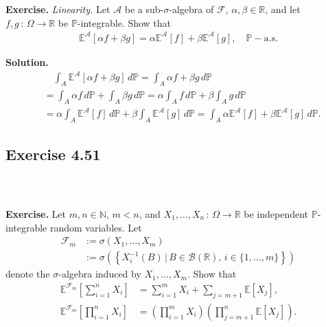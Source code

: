 \documentclass{beamer}
\numberwithin{equation}{section}
\newenvironment{frame2}{\begin{frame}\frametitle{{\normalsize \secname} \\ {\large \subsecname}}}{\end{frame}}
\begin{document}
\begin{frame2}
    \textbf{Exercise.}
    \textit{Linearity.}
    Let $\mathcal{A}$ be a sub-$\sigma$-algebra of $\mathcal{F}$, $\alpha,\beta \in \mathbb{R}$, and let $f,g \, : \, \Omega \rightarrow \mathbb{R}$ be $\mathbb{P}$-integrable.
    Show that
    \begin{align}
        \mathbb{E}^\mathcal{A}[\alpha f + \beta g] = \alpha \mathbb{E}^\mathcal{A}[ f] + \beta\mathbb{E}^\mathcal{A}[g], \quad \mathbb{P}-\text{a.s.} 
    \end{align}

    \vspace{10pt}
    \textbf{Solution.}
    \begin{align*}
        &\quad\int_A \mathbb{E}^{\mathcal{A}}\left[\alpha f + \beta g\right] \, d\mathbb{P} = \int_A \alpha f + \beta g \, d\mathbb{P}\\
        &= \int_A \alpha f \, d\mathbb{P} + \int_A \beta g \, d\mathbb{P} =  \alpha \int_A f \, d\mathbb{P} +  \beta \int_A g \, d\mathbb{P} \\
        &= \alpha \int_A \mathbb{E}^{\mathcal{A}}\left[f\right] \, d\mathbb{P} +  \beta \int_A \mathbb{E}^{\mathcal{A}}\left[g\right] \, d\mathbb{P} =  \int_A \alpha \mathbb{E}^{\mathcal{A}}\left[f\right] +  \beta \mathbb{E}^{\mathcal{A}}\left[g\right] \, d\mathbb{P}.
    \end{align*}
\end{frame2}

\subsection{Exercise 4.51}

\begin{frame2}
    \textbf{Exercise.}
    Let $m,n \in \mathbb{N}$, $m < n$, and $X_1, \ldots, X_n \, : \, \Omega \rightarrow \mathbb{R}$ be independent $\mathbb{P}$-integrable random variables.
    Let
    \begin{align}
        \mathcal{F}_m&:=\sigma(X_1,\ldots,X_m)\\
        &:=\sigma\left(\left\{X_i^{-1}(B)\,|\,B\in\mathcal{B}(\mathbb{R}),\, i \in \{1,\ldots,m\} \right\}\right)
    \end{align}
    denote the $\sigma$-algebra induced by $X_1,\ldots,X_m$.
    Show that
    \begin{align}
        \mathbb{E}^{\mathcal{F}_m}\left[ \sum_{i = 1}^n X_i \right] &= \sum_{i=1}^m X_i + \sum_{j = m+1}\mathbb{E}\left[X_j\right], \\
        \mathbb{E}^{\mathcal{F}_m}\left[ \prod_{i = 1}^n X_i \right] &= \left(\prod_{i=1}^m X_i\right)\left(\prod_{j=m+1}^n \mathbb{E}[X_j]\right).
    \end{align}

    \vspace{10pt}
\end{frame2}
\end{document}
